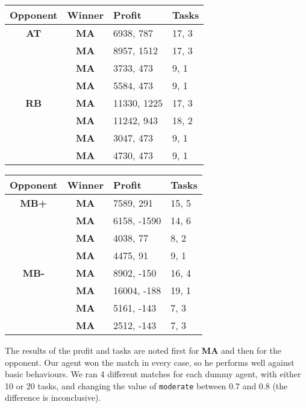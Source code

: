 \documentclass[12pt,a4paper]{article}
\begin{document}
\begin{multicols}{2}
\begin{tabular}{| c | c | l | l |}
\hline
Opponent & Winner & Profit & Tasks \\
\hline
\textbf{AT} & \textbf{MA} & 6938, 787 & 17, 3 \\ \cline{2-4}
 & \textbf{MA} & 8957, 1512 & 17, 3 \\ \cline{2-4}
 & \textbf{MA} & 3733, 473 & 9, 1 \\ \cline{2-4}
 & \textbf{MA} & 5584, 473 & 9, 1 \\ \hline \hline
 
\textbf{RB} & \textbf{MA} & 11330, 1225 & 17, 3 \\ \cline{2-4}
 & \textbf{MA} & 11242, 943 & 18, 2 \\ \cline{2-4}
 & \textbf{MA} & 3047, 473 & 9, 1 \\ \cline{2-4}
 & \textbf{MA} & 4730, 473 & 9, 1 \\ \hline

\end{tabular}

\begin{tabular}{| c | c | l | l |}
\hline
Opponent & Winner & Profit & Tasks \\
\hline 
 \textbf{MB+} & \textbf{MA} & 7589, 291 & 15, 5 \\ \cline{2-4}
 & \textbf{MA} & 6158, -1590 & 14, 6 \\ \cline{2-4}
 & \textbf{MA} & 4038, 77 & 8, 2 \\ \cline{2-4}
 & \textbf{MA} & 4475, 91 & 9, 1 \\ \hline \hline
 
  \textbf{MB-} & \textbf{MA} & 8902, -150 & 16, 4 \\ \cline{2-4}
 & \textbf{MA} & 16004, -188 & 19, 1 \\ \cline{2-4}
 & \textbf{MA} & 5161, -143 & 7, 3 \\ \cline{2-4}
 & \textbf{MA} & 2512, -143 & 7, 3 \\ \hline

\end{tabular}
\end{multicols}
The results of the profit and tasks are noted first for \textbf{MA} and then for the opponent. Our agent won the match in every case, so he performs well against basic behaviours. We ran 4 different matches for each dummy agent, with either 10 or 20 tasks, and changing the value of \texttt{moderate} between 0.7 and 0.8 (the difference is inconclusive). 
\end{document}
